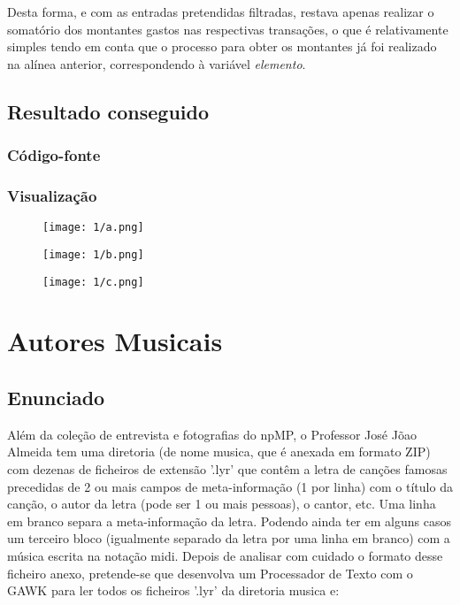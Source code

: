 \documentclass[12pt,a4paper]{report}
\begin{document}
\noindent Desta forma, e com as entradas pretendidas filtradas, restava apenas realizar o somatório dos montantes gastos nas respectivas transações, o que é relativamente simples tendo em conta que o processo para obter os montantes já foi realizado na alínea anterior, correspondendo à variável \emph{elemento}.


\section{Resultado conseguido}
\subsection{Código-fonte}



\subsection{Visualização}
\begin{figure}[H]
\centering
\texttt{[image: 1/a.png]}
\end{figure}
\begin{figure}[H]
\centering
\texttt{[image: 1/b.png]}
\end{figure}
\begin{figure}[H]
\centering
\texttt{[image: 1/c.png]}
\end{figure}


\chapter{Autores Musicais}
\section{Enunciado}
Além da coleção de entrevista e fotografias do npMP, o Professor José Jõao Almeida tem uma diretoria (de nome musica, que é anexada em formato ZIP) com dezenas de ficheiros de extensão ’.lyr’ que contêm a letra de canções famosas precedidas de 2 ou mais campos de meta-informação (1 por linha) com o título da canção, o autor da letra (pode ser 1 ou mais pessoas), o cantor, etc. Uma linha em branco separa a meta-informação da letra. Podendo ainda ter em alguns casos um terceiro bloco (igualmente separado da letra por uma linha em branco) com a música escrita na notação midi. 
Depois de analisar com cuidado o formato desse ficheiro anexo, pretende-se que desenvolva um Processador de Texto com o GAWK para ler todos os ficheiros ’.lyr’ da diretoria musica e:
\end{document}
